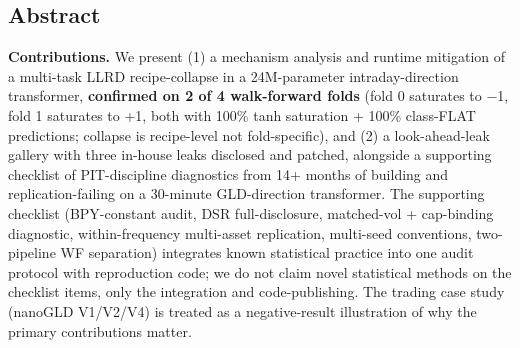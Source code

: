 \documentclass[
]{article}
\begin{document}
\subsection{Abstract}\label{abstract}

\textbf{Contributions.} We present (1) a mechanism analysis and runtime
mitigation of a multi-task LLRD recipe-collapse in a 24M-parameter
intraday-direction transformer, \textbf{confirmed on 2 of 4 walk-forward
folds} (fold 0 saturates to −1, fold 1 saturates to +1, both with 100\%
tanh saturation + 100\% class-FLAT predictions; collapse is recipe-level
not fold-specific), and (2) a look-ahead-leak gallery with three
in-house leaks disclosed and patched, alongside a supporting checklist
of PIT-discipline diagnostics from 14+ months of building and
replication-failing on a 30-minute GLD-direction transformer. The
supporting checklist (BPY-constant audit, DSR full-disclosure,
matched-vol + cap-binding diagnostic, within-frequency multi-asset
replication, multi-seed conventions, two-pipeline WF separation)
integrates known statistical practice into one audit protocol with
reproduction code; we do not claim novel statistical methods on the
checklist items, only the integration and code-publishing. The trading
case study (nanoGLD V1/V2/V4) is treated as a negative-result
illustration of why the primary contributions matter.
\end{document}

